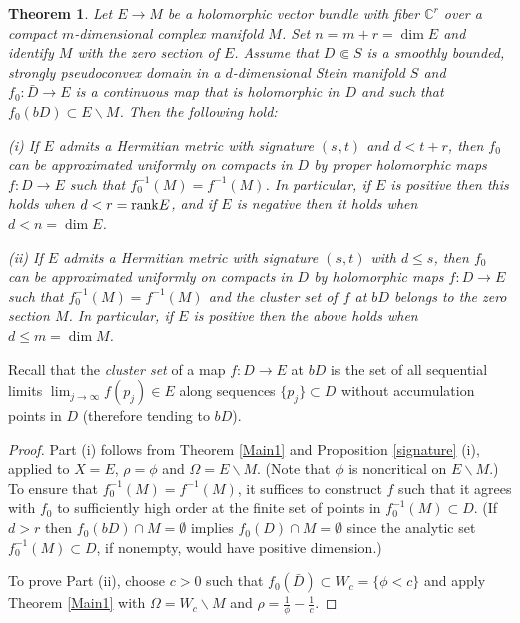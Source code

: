 \documentclass[11pt]{amsart}
\numberwithin{equation}{section}
\newtheorem{theorem}{Theorem}[section]
\theoremstyle{definition}
\begin{document}
\begin{theorem}
\label{total-space}
Let $E\to M$ be a holomorphic vector bundle with fiber ${\mathbb{C}}^r$
over a compact $m$-dimensional complex manifold $M$. Set $n=m+r=\dim E$
and identify $M$ with the zero section of $E$.
Assume that $D\Subset S$ is a smoothly bounded, 
strongly pseudoconvex domain in a 
$d$-dimensional Stein manifold $S$ and $f_0\colon\bar D\to E$ is 
a continuous map that is holomorphic in $D$ and such that  
$f_0(bD) \subset E{\backslash} M$. Then the following hold:

{\rm (i)} If $E$ admits a Hermitian metric with signature $(s,t)$
and $d<t+r$, then $f_0$ can be approximated uniformly on compacts 
in $D$ by proper holomorphic maps $f\colon D\to E$ such that
$f_0^{-1}(M)=f^{-1}(M)$. In particular, if $E$ is positive 
then this holds when $d<r={\rm rank}E$, and if $E$ is negative
then it holds when $d<n=\dim E$.

{\rm (ii)} If $E$ admits a Hermitian metric with signature $(s,t)$
with $d\le s$, then $f_0$ can be approximated uniformly on compacts 
in $D$ by holomorphic maps $f\colon D\to E$ such that
$f_0^{-1}(M)=f^{-1}(M)$ and the cluster set of $f$ at $bD$
belongs to the zero section $M$. In particular, if $E$ is positive 
then the above holds when $d\le m=\dim M$.
\end{theorem} 

Recall that the {\em cluster set} of a map $f\colon D\to E$
at $bD$ is the set of all sequential limits 
$\lim_{j\to\infty} f(p_j)\in E$ along sequences 
$\{p_j\} \subset D$ without accumulation points in $D$
(therefore tending to $bD$).

\begin{proof}
Part (i) follows from Theorem \ref{Main1} and 
Proposition \ref{signature} (i), applied to $X=E$, $\rho=\phi$
and $\Omega=E{\backslash} M$. (Note that $\phi$ is noncritical on $E{\backslash} M$.)
To ensure that $f_0^{-1}(M)=f^{-1}(M)$,
it suffices to construct $f$ such that it agrees with $f_0$
to sufficiently high order at the finite set of points
in $f_0^{-1}(M)\subset D$. (If $d>r$ then $f_0(bD)\cap M=\emptyset$ 
implies $f_0(D)\cap M=\emptyset$ since the analytic set $f_0^{-1}(M) \subset D$, 
if nonempty, would have positive dimension.) 

To prove Part (ii), choose $c>0$ such that $f_0(\bar D) \subset W_c=\{\phi<c\}$
and apply Theorem \ref{Main1} with $\Omega =W_c{\backslash} M$ and
$\rho=\frac{1}{\phi}-\frac{1}{c}$. 
\end{proof}
 
\end{document}
